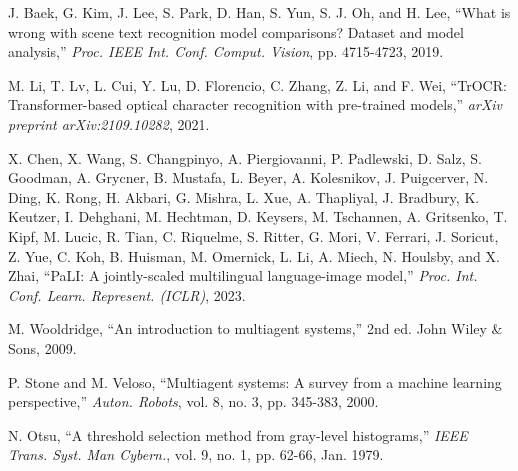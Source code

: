 \documentclass[10pt,twocolumn]{article}
\begin{document}
\begin{thebibliography}{99}
J. Baek, G. Kim, J. Lee, S. Park, D. Han, S. Yun, S. J. Oh, and H. Lee, ``What is wrong with scene text recognition model comparisons? Dataset and model analysis,'' \textit{Proc. IEEE Int. Conf. Comput. Vision}, pp. 4715-4723, 2019.

M. Li, T. Lv, L. Cui, Y. Lu, D. Florencio, C. Zhang, Z. Li, and F. Wei, ``TrOCR: Transformer-based optical character recognition with pre-trained models,'' \textit{arXiv preprint arXiv:2109.10282}, 2021.

X. Chen, X. Wang, S. Changpinyo, A. Piergiovanni, P. Padlewski, D. Salz, S. Goodman, A. Grycner, B. Mustafa, L. Beyer, A. Kolesnikov, J. Puigcerver, N. Ding, K. Rong, H. Akbari, G. Mishra, L. Xue, A. Thapliyal, J. Bradbury, K. Keutzer, I. Dehghani, M. Hechtman, D. Keysers, M. Tschannen, A. Gritsenko, T. Kipf, M. Lucic, R. Tian, C. Riquelme, S. Ritter, G. Mori, V. Ferrari, J. Soricut, Z. Yue, C. Koh, B. Huisman, M. Omernick, L. Li, A. Miech, N. Houlsby, and X. Zhai, ``PaLI: A jointly-scaled multilingual language-image model,'' \textit{Proc. Int. Conf. Learn. Represent. (ICLR)}, 2023.

M. Wooldridge, ``An introduction to multiagent systems,'' 2nd ed. John Wiley \& Sons, 2009.

P. Stone and M. Veloso, ``Multiagent systems: A survey from a machine learning perspective,'' \textit{Auton. Robots}, vol. 8, no. 3, pp. 345-383, 2000.

N. Otsu, ``A threshold selection method from gray-level histograms,'' \textit{IEEE Trans. Syst. Man Cybern.}, vol. 9, no. 1, pp. 62-66, Jan. 1979.

\end{thebibliography}

\end{document}

